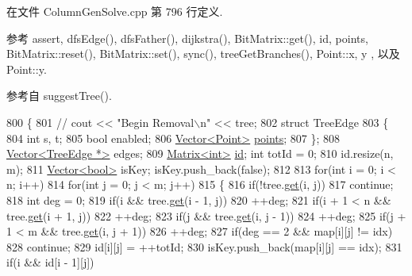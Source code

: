在文件 Column\+Gen\+Solve.\+cpp 第 796 行定义.



参考 assert, dfs\+Edge(), dfs\+Father(), dijkstra(), Bit\+Matrix\+::get(), id, points, Bit\+Matrix\+::reset(), Bit\+Matrix\+::set(), sync(), tree\+Get\+Branches(), Point\+::x, y , 以及 Point\+::y.



参考自 suggest\+Tree().


\begin{DoxyCode}
800 \{
801     \textcolor{comment}{// cout << "Begin Removal\(\backslash\)n" << tree;}
802     \textcolor{keyword}{struct }TreeEdge
803     \{
804         \textcolor{keywordtype}{int} s, t;
805         \textcolor{keywordtype}{bool} enabled;
806         \hyperlink{classVector}{Vector<Point>} \hyperlink{classes_8txt_ae368e6252d0add75ea011d5d90db68ed}{points};
807     \};
808     \hyperlink{classVector}{Vector<TreeEdge *>} edges;
809     \hyperlink{classMatrix}{Matrix<int>} \hyperlink{classes_8txt_a7441ef0865bcb3db9b8064dd7375c1ea}{id}; \textcolor{keywordtype}{int} totId = 0;
810     \textcolor{keywordtype}{id}.resize(n, m);
811     \hyperlink{classVector}{Vector<bool>} isKey; isKey.push\_back(\textcolor{keyword}{false});
812     
813     \textcolor{keywordflow}{for}(\textcolor{keywordtype}{int} i = 0; i < n; i++)
814         \textcolor{keywordflow}{for}(\textcolor{keywordtype}{int} j = 0; j < m; j++)
815         \{
816             \textcolor{keywordflow}{if}(!tree.\hyperlink{classBitMatrix_ad19d1045b54ccc8a99d70d38305b4ca6}{get}(i, j))
817                 \textcolor{keywordflow}{continue};
818             \textcolor{keywordtype}{int} deg = 0;
819             \textcolor{keywordflow}{if}(i && tree.\hyperlink{classBitMatrix_ad19d1045b54ccc8a99d70d38305b4ca6}{get}(i - 1, j))
820                 ++deg;
821             \textcolor{keywordflow}{if}(i + 1 < n && tree.\hyperlink{classBitMatrix_ad19d1045b54ccc8a99d70d38305b4ca6}{get}(i + 1, j))
822                 ++deg;
823             \textcolor{keywordflow}{if}(j && tree.\hyperlink{classBitMatrix_ad19d1045b54ccc8a99d70d38305b4ca6}{get}(i, j - 1))
824                 ++deg;
825             \textcolor{keywordflow}{if}(j + 1 < m && tree.\hyperlink{classBitMatrix_ad19d1045b54ccc8a99d70d38305b4ca6}{get}(i, j + 1))
826                 ++deg;
827             \textcolor{keywordflow}{if}(deg == 2 && map[i][j] != idx)
828                 \textcolor{keywordflow}{continue};
829             \textcolor{keywordtype}{id}[i][j] = ++totId;
830             isKey.push\_back(map[i][j] == idx);
831             \textcolor{keywordflow}{if}(i && \textcolor{keywordtype}{id}[i - 1][j])

\end{DoxyCode}
